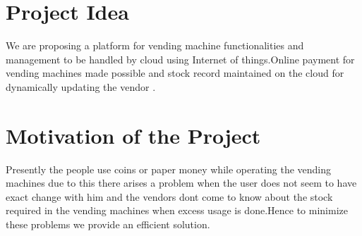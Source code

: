 \documentclass[oneside,a4paper,12pt]{report}
\begin{document}
\section{Project Idea}

 We are proposing a platform for vending machine functionalities and management to be  handled by cloud using Internet of things.Online payment for vending machines made possible and stock record maintained on the cloud for dynamically updating the vendor .


\section{Motivation of the Project}  

 Presently the people use coins or paper money while operating the vending machines due to this there arises a problem when the user does not seem to have exact change with him and the vendors dont come to know about the stock required in the vending machines when excess usage is done.Hence to minimize these problems we provide an efficient solution.
\end{document}
